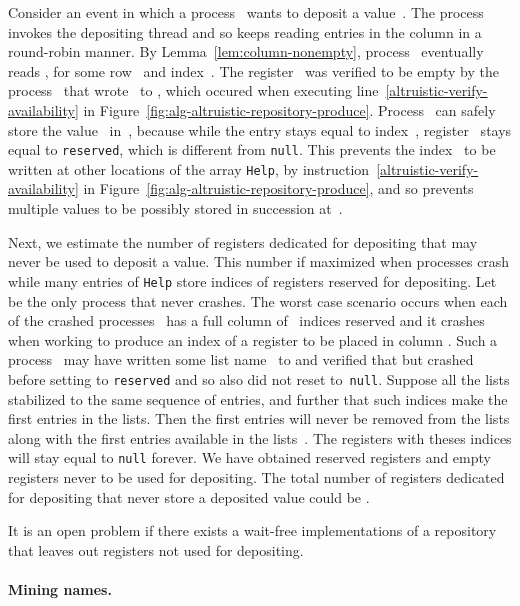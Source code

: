 \documentclass[11pt]{article}
\newcommand{\BBB}{\vspace*{-\bigskipamount}}
\newcommand{\Paragraph}[1]{\BBB\paragraph{#1}}
\newcommand{\qed}{\hfill  \smallbreak}
\newenvironment{proof}{\noindent{\bf Proof:}}{\qed}
\begin{document}
\begin{proof}
Consider an event in which a process~ wants to deposit a value~.
The process invokes the depositing thread and so keeps reading entries in the column  in a round-robin manner.
By Lemma~\ref{lem:column-nonempty}, process~ eventually reads ,  for some row~ and index~. 
The register~ was verified to be empty by the process~ that wrote~ to , which occured when executing line~\eqref{altruistic-verify-availability} in Figure~\ref{fig:alg-altruistic-repository-produce}.
Process~ can safely store the value~ in~, because while the entry  stays equal to index~, register~ stays equal to \texttt{reserved}, which is different from \texttt{null}.
This prevents the index~ to be written at other locations of the array \texttt{Help}, by instruction~\eqref{altruistic-verify-availability} in Figure~\ref{fig:alg-altruistic-repository-produce}, and so prevents multiple values to be possibly stored in succession at~.

Next, we estimate the number of registers dedicated for depositing that may never be used to deposit a value.
This number if maximized when  processes crash while many entries of  \texttt{Help} store indices of  registers reserved for depositing.
Let  be the only process that never crashes.
The worst case scenario occurs when each of the crashed processes~ has a full column of~ indices reserved and it crashes when working to produce an index of a register to be placed in column .
Such a process~ may have written some list name~ to  and verified that  but crashed before setting  to \texttt{reserved} and so also did not reset  to~\texttt{null}.
Suppose all the lists  stabilized to the same sequence of entries, and further that such indices  make the first  entries in the lists. 
Then the first  entries will never be removed from the lists along with the first  entries available in the lists~.
The registers with theses  indices will stay equal to \texttt{null} forever.
We have obtained  reserved registers and   empty registers never to be used for depositing.
The total number of registers dedicated for depositing that never store a deposited value could be .
\end{proof}

It is an open problem if there exists a wait-free implementations of a repository that leaves out  registers not used for depositing.





\Paragraph{Mining names.}
\end{document}
